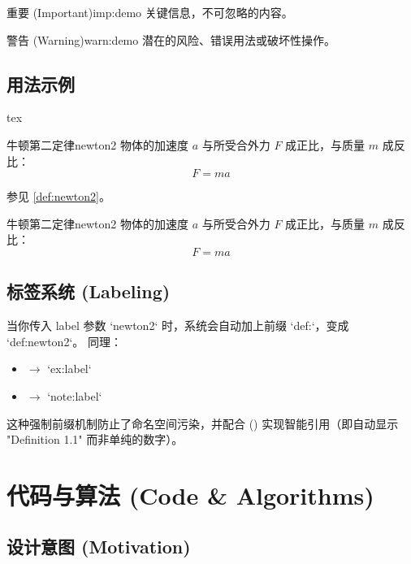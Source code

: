 \documentclass[
    outputdir=build,
    colorscheme=Tech,
    shorthand=true,
    code=true,
    fontset=lit
]{Hypo-Note}
\begin{document}
\begin{important}{重要 (Important)}{imp:demo}
    关键信息，不可忽略的内容。
\end{important}

\begin{warning}{警告 (Warning)}{warn:demo}
    潜在的风险、错误用法或破坏性操作。
\end{warning}

\section{用法示例}

\begin{hypocode}{tex}
\begin{definition}{牛顿第二定律}{newton2}
    物体的加速度 $a$ 与所受合外力 $F$ 成正比，与质量 $m$ 成反比：
    \[ F = ma \]
\end{definition}

参见 \cref{def:newton2}。
\end{hypocode}

\begin{definition}{牛顿第二定律}{newton2}
    物体的加速度 $a$ 与所受合外力 $F$ 成正比，与质量 $m$ 成反比：
    \[ F = ma \]
\end{definition}

\section{标签系统 (Labeling)}

当你传入 label 参数 `newton2` 时，系统会自动加上前缀 `def:`，变成 `def:newton2`。
同理：
\begin{itemize}
    \item {} $\rightarrow$ `ex:label`
    \item {} $\rightarrow$ `note:label`
\end{itemize}

这种强制前缀机制防止了命名空间污染，并配合  () 实现智能引用（即自动显示 "Definition 1.1" 而非单纯的数字）。

\chapter{代码与算法 (Code \& Algorithms)}

\section{设计意图 (Motivation)}
\end{document}
